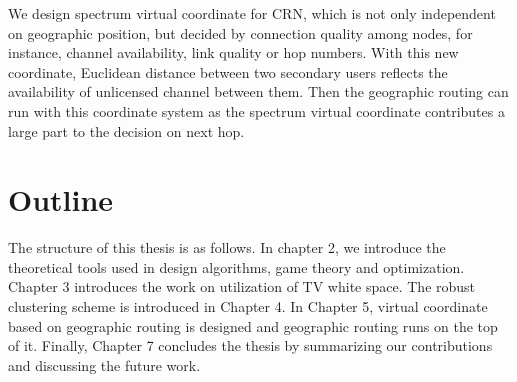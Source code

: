 We design spectrum virtual coordinate for CRN, which is not only independent on geographic position, but decided by connection quality among nodes, for instance, channel availability, link quality or hop numbers.
With this new coordinate, Euclidean distance between two secondary users reflects the availability of unlicensed channel between them.
Then the geographic routing can run with this coordinate system as the spectrum virtual coordinate contributes a large part to the decision on next hop.
%
%
%
%




\section{Outline}
The structure of this thesis is as follows.
In chapter 2, we introduce the theoretical tools used in design algorithms, \ie game theory and optimization. 
Chapter 3 introduces the work on utilization of TV white space.
The robust clustering scheme is introduced in Chapter 4.
In Chapter 5, virtual coordinate based on geographic routing is designed and geographic routing runs on the top of it.
Finally, Chapter 7 concludes the thesis by summarizing our contributions and discussing the future work.




